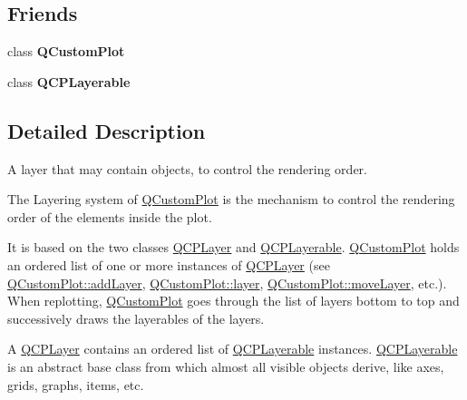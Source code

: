 \subsection*{Friends}
\begin{DoxyCompactItemize}
\item 
\hypertarget{classQCPLayer_a1cdf9df76adcfae45261690aa0ca2198}{}class {\bfseries Q\+Custom\+Plot}\label{classQCPLayer_a1cdf9df76adcfae45261690aa0ca2198}

\item 
\hypertarget{classQCPLayer_ad655f55cccf49ba14d5172ec517e07ae}{}class {\bfseries Q\+C\+P\+Layerable}\label{classQCPLayer_ad655f55cccf49ba14d5172ec517e07ae}

\end{DoxyCompactItemize}


\subsection{Detailed Description}
A layer that may contain objects, to control the rendering order. 

The Layering system of \hyperlink{classQCustomPlot}{Q\+Custom\+Plot} is the mechanism to control the rendering order of the elements inside the plot.

It is based on the two classes \hyperlink{classQCPLayer}{Q\+C\+P\+Layer} and \hyperlink{classQCPLayerable}{Q\+C\+P\+Layerable}. \hyperlink{classQCustomPlot}{Q\+Custom\+Plot} holds an ordered list of one or more instances of \hyperlink{classQCPLayer}{Q\+C\+P\+Layer} (see \hyperlink{classQCustomPlot_ad5255393df078448bb6ac83fa5db5f52}{Q\+Custom\+Plot\+::add\+Layer}, \hyperlink{classQCustomPlot_aac492da01782820454e9136a8db28182}{Q\+Custom\+Plot\+::layer}, \hyperlink{classQCustomPlot_ae896140beff19424e9e9e02d6e331104}{Q\+Custom\+Plot\+::move\+Layer}, etc.). When replotting, \hyperlink{classQCustomPlot}{Q\+Custom\+Plot} goes through the list of layers bottom to top and successively draws the layerables of the layers.

A \hyperlink{classQCPLayer}{Q\+C\+P\+Layer} contains an ordered list of \hyperlink{classQCPLayerable}{Q\+C\+P\+Layerable} instances. \hyperlink{classQCPLayerable}{Q\+C\+P\+Layerable} is an abstract base class from which almost all visible objects derive, like axes, grids, graphs, items, etc.


